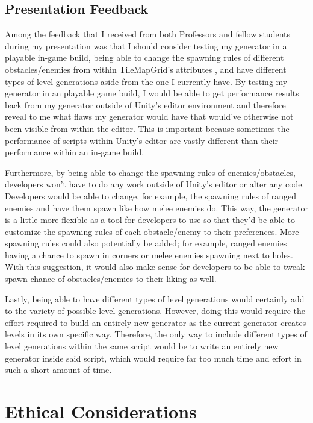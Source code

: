 \documentclass[10pt,twocolumn]{article}
\begin{document}
\subsection{Presentation Feedback}

Among the feedback that I received from both Professors and fellow students during my presentation was that I should consider testing my generator in a playable in-game build, being able to change the spawning rules of different obstacles/enemies from within TileMapGrid's attributes , and have different types of level generations aside from the one I currently have.  By testing my generator in an playable game build, I would be able to get performance results back from my generator outside of Unity's editor environment and therefore reveal to me what flaws my generator would have that would've otherwise not been visible from within the editor. This is important because sometimes the performance of scripts within Unity's editor are vastly different than their performance within an in-game build.

Furthermore, by being able to change the spawning rules of enemies/obstacles, developers won't have to do any work outside of Unity's editor or alter any code. Developers would be able to change, for example, the spawning rules of ranged enemies and have them spawn like how melee enemies do. This way, the generator is a little more flexible as a tool for developers to use so that they'd be able to customize the spawning rules of each obstacle/enemy to their preferences. More spawning rules could also potentially be added; for example, ranged enemies having a chance to spawn in corners or melee enemies spawning next to holes. With this suggestion, it would also make sense for developers to be able to tweak spawn chance of obstacles/enemies to their liking as well.

Lastly, being able to have different types of level generations would certainly add to the variety of possible level generations. However, doing this would require the effort required to build an entirely new generator as the current generator creates levels in its own specific way. Therefore, the only way to include different types of level generations within the same script would be to write an entirely new generator inside said script, which would require far too much time and effort in such a short amount of time. 

\section{Ethical Considerations}
\end{document}
